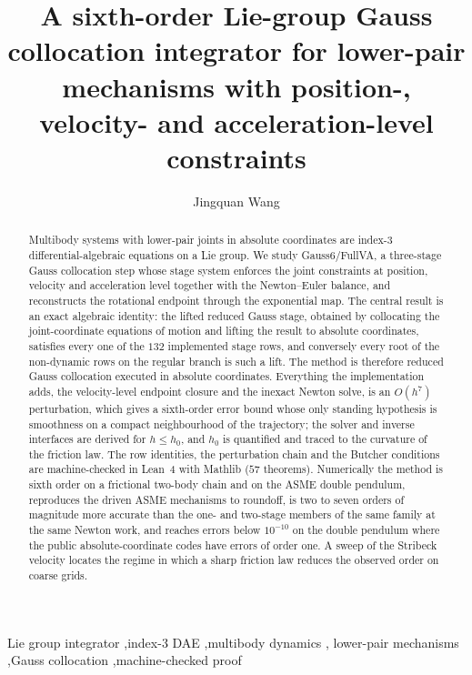 \documentclass[preprint,12pt]{elsarticle}
\newcommand{\method}{Gauss6\slash FullVA}
\begin{document}
\begin{frontmatter}

\title{A sixth-order Lie-group Gauss collocation integrator for lower-pair mechanisms with position-, velocity- and acceleration-level constraints}

\author[inst1]{Jingquan Wang}


\begin{abstract}
Multibody systems with lower-pair joints in absolute coordinates are index-3 differential-algebraic
equations on a Lie group. We study \method{}, a three-stage Gauss collocation step whose stage
system enforces the joint constraints at position, velocity and acceleration level together with
the Newton--Euler balance, and reconstructs the rotational endpoint through the exponential map.
The central result is an exact algebraic identity: the lifted reduced Gauss stage, obtained by
collocating the joint-coordinate equations of motion and lifting the result to absolute
coordinates, satisfies every one of the $132$ implemented stage rows, and conversely every root of
the non-dynamic rows on the regular branch is such a lift. The method is therefore reduced Gauss
collocation executed in absolute coordinates. Everything the implementation adds, the
velocity-level endpoint closure and the inexact Newton solve, is an $O(h^7)$ perturbation, which
gives a sixth-order error bound whose only standing hypothesis is smoothness on a compact
neighbourhood of the trajectory; the solver and inverse interfaces are derived for $h\le h_0$, and
$h_0$ is quantified and traced to the curvature of the friction law. The row identities, the
perturbation chain and the Butcher conditions are machine-checked in Lean~4 with Mathlib
($57$ theorems). Numerically the method is sixth order on a frictional two-body chain and on the
ASME double pendulum, reproduces the driven ASME mechanisms to roundoff, is two to seven orders of
magnitude more accurate than the one- and two-stage members of the same family at the same Newton
work, and reaches errors below $10^{-10}$ on the double pendulum where the public
absolute-coordinate codes have errors of order one. A sweep of the Stribeck velocity locates the
regime in which a sharp friction law reduces the observed order on coarse grids.
\end{abstract}

\begin{keyword}
Lie group integrator \sep index-3 DAE \sep multibody dynamics \sep
lower-pair mechanisms \sep Gauss collocation \sep machine-checked proof
\end{keyword}

\end{frontmatter}
\end{document}
